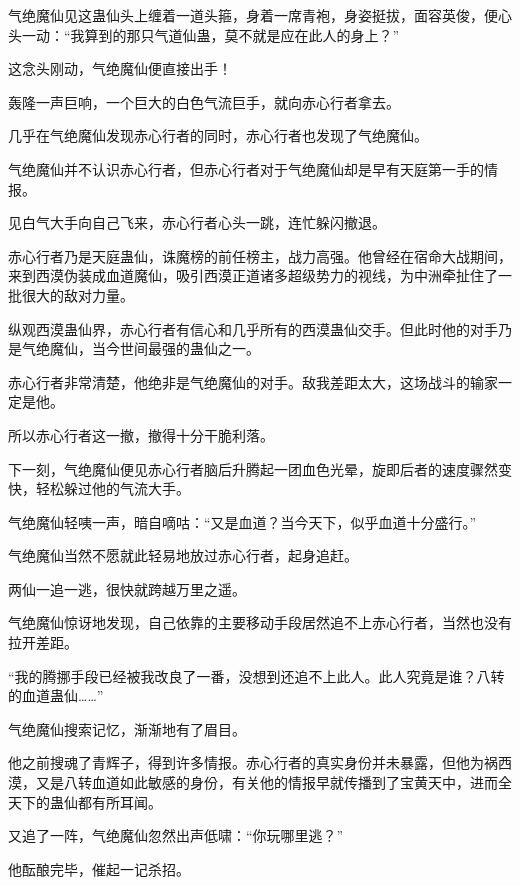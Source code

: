 
\begin{this_body}



气绝魔仙见这蛊仙头上缠着一道头箍，身着一席青袍，身姿挺拔，面容英俊，便心头一动：“我算到的那只气道仙蛊，莫不就是应在此人的身上？”

这念头刚动，气绝魔仙便直接出手！

轰隆一声巨响，一个巨大的白色气流巨手，就向赤心行者拿去。

几乎在气绝魔仙发现赤心行者的同时，赤心行者也发现了气绝魔仙。

气绝魔仙并不认识赤心行者，但赤心行者对于气绝魔仙却是早有天庭第一手的情报。

见白气大手向自己飞来，赤心行者心头一跳，连忙躲闪撤退。

赤心行者乃是天庭蛊仙，诛魔榜的前任榜主，战力高强。他曾经在宿命大战期间，来到西漠伪装成血道魔仙，吸引西漠正道诸多超级势力的视线，为中洲牵扯住了一批很大的敌对力量。

纵观西漠蛊仙界，赤心行者有信心和几乎所有的西漠蛊仙交手。但此时他的对手乃是气绝魔仙，当今世间最强的蛊仙之一。

赤心行者非常清楚，他绝非是气绝魔仙的对手。敌我差距太大，这场战斗的输家一定是他。

所以赤心行者这一撤，撤得十分干脆利落。

下一刻，气绝魔仙便见赤心行者脑后升腾起一团血色光晕，旋即后者的速度骤然变快，轻松躲过他的气流大手。

气绝魔仙轻咦一声，暗自嘀咕：“又是血道？当今天下，似乎血道十分盛行。”

气绝魔仙当然不愿就此轻易地放过赤心行者，起身追赶。

两仙一追一逃，很快就跨越万里之遥。

气绝魔仙惊讶地发现，自己依靠的主要移动手段居然追不上赤心行者，当然也没有拉开差距。

“我的腾挪手段已经被我改良了一番，没想到还追不上此人。此人究竟是谁？八转的血道蛊仙……”

气绝魔仙搜索记忆，渐渐地有了眉目。

他之前搜魂了青辉子，得到许多情报。赤心行者的真实身份并未暴露，但他为祸西漠，又是八转血道如此敏感的身份，有关他的情报早就传播到了宝黄天中，进而全天下的蛊仙都有所耳闻。

又追了一阵，气绝魔仙忽然出声低啸：“你玩哪里逃？”

他酝酿完毕，催起一记杀招。


\end{this_body}
